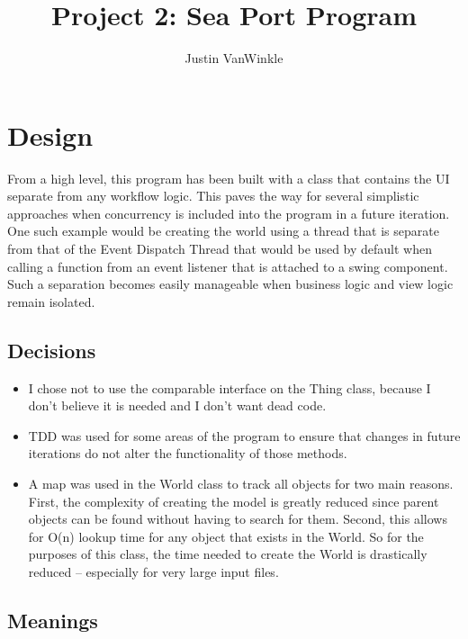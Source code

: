 \documentclass[english,floatsintext,man]{apa6}
\title{Project 2: Sea Port Program}
\author{Justin VanWinkle}
\affiliation{
    \vspace{0.5cm}
          \textsuperscript{} 9 April 2017  }
\providecommand{\tightlist}{%
  \setlength{\itemsep}{0pt}\setlength{\parskip}{0pt}}
\begin{document}
\maketitle

\setcounter{secnumdepth}{0}



\section{Design}\label{design}

From a high level, this program has been built with a class that
contains the UI separate from any workflow logic. This paves the way for
several simplistic approaches when concurrency is included into the
program in a future iteration. One such example would be creating the
world using a thread that is separate from that of the Event Dispatch
Thread that would be used by default when calling a function from an
event listener that is attached to a swing component. Such a separation
becomes easily manageable when business logic and view logic remain
isolated.

\subsection{Decisions}\label{decisions}

\begin{itemize}
\tightlist
\item
  I chose not to use the comparable interface on the Thing class,
  because I don't believe it is needed and I don't want dead code.
\item
  TDD was used for some areas of the program to ensure that changes in
  future iterations do not alter the functionality of those methods.
\item
  A map was used in the World class to track all objects for two main
  reasons. First, the complexity of creating the model is greatly
  reduced since parent objects can be found without having to search for
  them. Second, this allows for O(n) lookup time for any object that
  exists in the World. So for the purposes of this class, the time
  needed to create the World is drastically reduced -- especially for
  very large input files.
\end{itemize}

\subsection{Meanings}\label{meanings}
\end{document}
